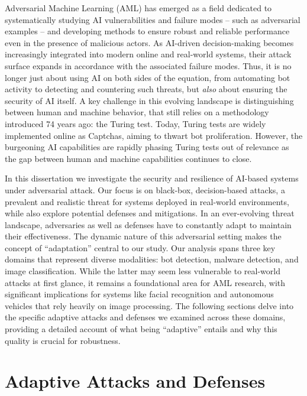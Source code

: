 Adversarial Machine Learning (AML) has emerged as a field dedicated to systematically studying \gls{AI} vulnerabilities and failure modes -- such as adversarial examples -- and developing methods to ensure robust and reliable performance even in the presence of malicious actors.
As AI-driven decision-making becomes increasingly integrated into modern online and real-world systems, their attack surface expands in accordance with the associated failure modes.
Thus, it is no longer just about using AI on both sides of the equation, from automating bot activity to detecting and countering such threats, but \textit{also} about ensuring the security of AI itself.
A key challenge in this evolving landscape is distinguishing between human and machine behavior, that still relies on a methodology introduced 74 years ago: the Turing test.
Today, Turing tests are widely implemented online as Captchas, aiming to thwart bot proliferation.
However, the burgeoning \gls{AI} capabilities are rapidly phasing Turing tests out of relevance as the gap between human and machine capabilities continues to close.

In this dissertation we investigate the security and resilience of AI-based systems under adversarial attack.
Our focus is on black-box, decision-based attacks, a prevalent and realistic threat for systems deployed in real-world environments, while also explore potential defenses and mitigations.
In an ever-evolving threat landscape, adversaries as well as defenses have to constantly adapt to maintain their effectiveness.
The dynamic nature of this adversarial setting makes the concept of ``adaptation'' central to our study.
Our analysis spans three key domains that represent diverse modalities: bot detection, malware detection, and image classification.
While the latter may seem less vulnerable to real-world attacks at first glance, it remains a foundational area for \gls{AML} research, with significant implications for systems like facial recognition and autonomous vehicles that rely heavily on image processing.
The following sections delve into the specific adaptive attacks and defenses we examined across these domains, providing a detailed account of what being ``adaptive'' entails and why this quality is crucial for robustness.

\section{Adaptive Attacks and Defenses}


